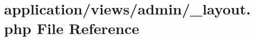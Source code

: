 \hypertarget{admin_2__layout_8php}{\section{application/views/admin/\-\_\-layout.php File Reference}
\label{admin_2__layout_8php}
}
